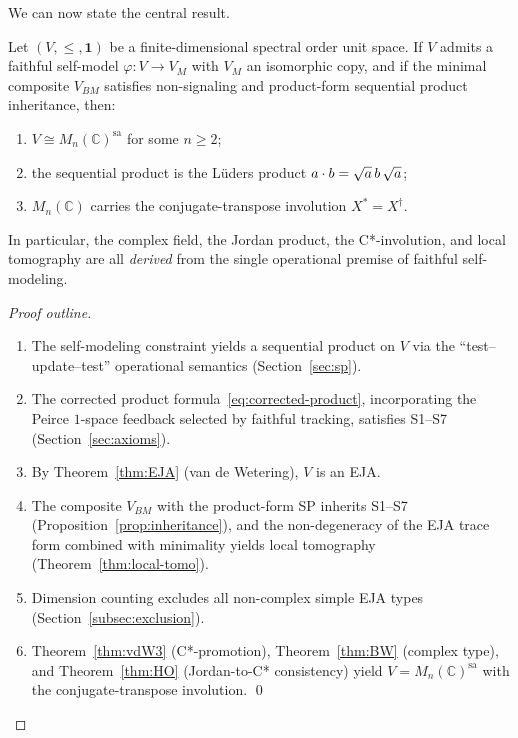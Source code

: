 We can now state the central result.

\begin{theorem}\label{thm:main}
Let $(V, \le, \mathbf{1})$ be a finite-dimensional spectral order unit
space. If $V$ admits a faithful self-model $\varphi\colon V \to V_M$
with $V_M$ an isomorphic copy, and if the minimal composite $V_{BM}$
satisfies non-signaling and product-form sequential product inheritance,
then:
\begin{enumerate}
\item $V \cong M_n(\mathbb{C})^{\mathrm{sa}}$ for some $n \ge 2$;
\item the sequential product is the L\"uders product
  $\sp{a}{b} = \sqrt{a}\, b\, \sqrt{a}$;
\item $M_n(\mathbb{C})$ carries the conjugate-transpose involution
  $X^* = X^\dagger$.
\end{enumerate}
\end{theorem}

In particular, the complex field, the Jordan product, the C*-involution,
and local tomography are all \emph{derived} from the single operational
premise of faithful self-modeling.

\begin{proof}[Proof outline]
\mbox{}%
\begin{enumerate}
\item The self-modeling constraint yields a sequential product on
  $V$ via the ``test--update--test'' operational
  semantics (Section~\ref{sec:sp}).
\item The corrected product formula~\eqref{eq:corrected-product},
  incorporating the Peirce $1$-space feedback selected by faithful
  tracking, satisfies S1--S7
  (Section~\ref{sec:axioms}).
\item By Theorem~\ref{thm:EJA} (van de Wetering), $V$ is an EJA.
\item The composite $V_{BM}$ with the product-form SP inherits
  S1--S7 (Proposition~\ref{prop:inheritance}), and the
  non-degeneracy of the EJA trace form combined with minimality yields
  local tomography (Theorem~\ref{thm:local-tomo}).
\item Dimension counting excludes all non-complex simple EJA types
  (Section~\ref{subsec:exclusion}).
\item Theorem~\ref{thm:vdW3} (C*-promotion),
  Theorem~\ref{thm:BW} (complex type), and
  Theorem~\ref{thm:HO} (Jordan-to-C* consistency) yield
  $V = M_n(\mathbb{C})^{\mathrm{sa}}$ with the conjugate-transpose
  involution. \qed
\end{enumerate}
\end{proof}
